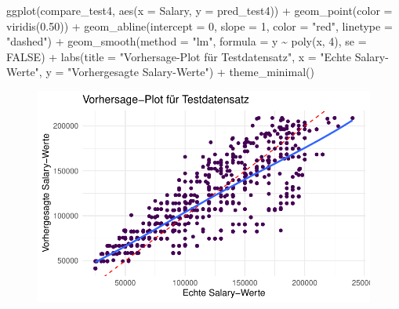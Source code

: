 \documentclass[
  letterpaper,
  DIV=11,
  numbers=noendperiod]{scrartcl}
\newenvironment{Shaded}{\begin{snugshade}}{\end{snugshade}}
\newcommand{\AttributeTok}[1]{\textcolor[rgb]{0.40,0.45,0.13}{#1}}
\newcommand{\ConstantTok}[1]{\textcolor[rgb]{0.56,0.35,0.01}{#1}}
\newcommand{\DecValTok}[1]{\textcolor[rgb]{0.68,0.00,0.00}{#1}}
\newcommand{\FloatTok}[1]{\textcolor[rgb]{0.68,0.00,0.00}{#1}}
\newcommand{\FunctionTok}[1]{\textcolor[rgb]{0.28,0.35,0.67}{#1}}
\newcommand{\NormalTok}[1]{\textcolor[rgb]{0.00,0.23,0.31}{#1}}
\newcommand{\SpecialCharTok}[1]{\textcolor[rgb]{0.37,0.37,0.37}{#1}}
\newcommand{\StringTok}[1]{\textcolor[rgb]{0.13,0.47,0.30}{#1}}
\begin{document}
\begin{Shaded}
\begin{Highlighting}[]
\FunctionTok{ggplot}\NormalTok{(compare\_test4, }\FunctionTok{aes}\NormalTok{(}\AttributeTok{x =}\NormalTok{ Salary, }\AttributeTok{y =}\NormalTok{ pred\_test4)) }\SpecialCharTok{+}
  \FunctionTok{geom\_point}\NormalTok{(}\AttributeTok{color =} \FunctionTok{viridis}\NormalTok{(}\FloatTok{0.50}\NormalTok{)) }\SpecialCharTok{+}
  \FunctionTok{geom\_abline}\NormalTok{(}\AttributeTok{intercept =} \DecValTok{0}\NormalTok{, }\AttributeTok{slope =} \DecValTok{1}\NormalTok{, }\AttributeTok{color =} \StringTok{"red"}\NormalTok{, }\AttributeTok{linetype =} \StringTok{"dashed"}\NormalTok{) }\SpecialCharTok{+}
  \FunctionTok{geom\_smooth}\NormalTok{(}\AttributeTok{method =} \StringTok{"lm"}\NormalTok{, }\AttributeTok{formula =}\NormalTok{ y }\SpecialCharTok{\textasciitilde{}} \FunctionTok{poly}\NormalTok{(x, }\DecValTok{4}\NormalTok{), }\AttributeTok{se =} \ConstantTok{FALSE}\NormalTok{) }\SpecialCharTok{+}
  \FunctionTok{labs}\NormalTok{(}\AttributeTok{title =} \StringTok{"Vorhersage{-}Plot für Testdatensatz"}\NormalTok{,}
       \AttributeTok{x =} \StringTok{"Echte Salary{-}Werte"}\NormalTok{,}
       \AttributeTok{y =} \StringTok{"Vorhergesagte Salary{-}Werte"}\NormalTok{) }\SpecialCharTok{+}
  \FunctionTok{theme\_minimal}\NormalTok{()}
\end{Highlighting}
\end{Shaded}

\begin{figure}[H]

{\centering \includegraphics{main_doc_files/figure-pdf/unnamed-chunk-148-2.pdf}

}

\end{figure}
\end{document}
